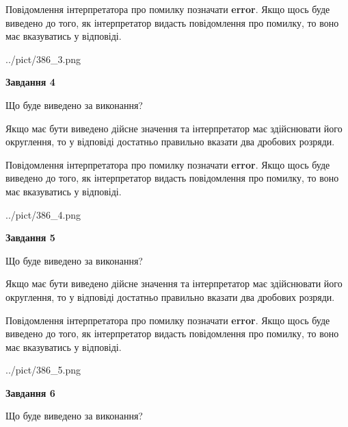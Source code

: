 \documentclass[12pt, ukrainian]{article}
\begin{document}
{\begin {Large}
Повідомлення інтерпретатора про помилку позначати \textbf{error}.
Якщо щось буде виведено до того, як інтерпретатор видасть повідомлення про помилку, 
то воно має вказуватись у відповіді. \par

\begin{center}
	{../pict/386_3.png}
\end{center}
\newpage

{\begin {center}\textbf{Завдання 4}\end {center}}\par
Що буде виведено за виконання? \par

Якщо має бути виведено дійсне значення та інтерпретатор має здійснювати його округлення, 
то у відповіді достатньо правильно вказати два дробових розряди.

Повідомлення інтерпретатора про помилку позначати \textbf{error}.
Якщо щось буде виведено до того, як інтерпретатор видасть повідомлення про помилку, 
то воно має вказуватись у відповіді. \par

\begin{center}
	{../pict/386_4.png}
\end{center}
\newpage

{\begin {center}\textbf{Завдання 5}\end {center}}\par
Що буде виведено за виконання? \par

Якщо має бути виведено дійсне значення та інтерпретатор має здійснювати його округлення, 
то у відповіді достатньо правильно вказати два дробових розряди.

Повідомлення інтерпретатора про помилку позначати \textbf{error}.
Якщо щось буде виведено до того, як інтерпретатор видасть повідомлення про помилку, 
то воно має вказуватись у відповіді. \par

\begin{center}
	{../pict/386_5.png}
\end{center}
\newpage

{\begin {center}\textbf{Завдання 6}\end {center}}\par
Що буде виведено за виконання? \par


\end{Large}}
\end{document}
